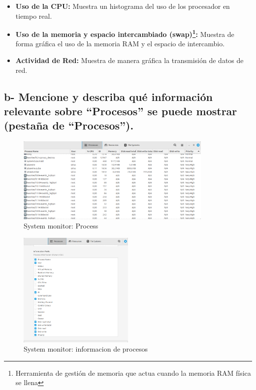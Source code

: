\documentclass{article}
\begin{document}
\begin{itemize}
    \item \textbf{Uso de la CPU:} Muestra un histograma del uso de los procesador en tiempo real.
    \item \textbf{Uso de la memoria y espacio intercambiado (swap)\footnote{Herramienta de gestión de memoria que actua cuando la memoria RAM física se llena}: }
    Muestra de forma gráfica el uso de la memoria RAM y el espacio de intercambio.
    \item \textbf{Actividad de Red: } Muestra de manera gráfica la transmisión de  datos de red.
\end{itemize}

\subsection*{b- Mencione y describa qué información relevante sobre “Procesos” se puede mostrar (pestaña de “Procesos”).}

\begin{figure}[h]
  \centering
  \includegraphics[width=0.85\textwidth]{resources/ej2b2.png}
  \caption{System monitor: Process}
\end{figure}

\begin{figure}[h]
  \centering
  \includegraphics[width=0.5\textwidth]{resources/ej2b.png}
  \caption{System monitor: informacion de procesos}
\end{figure}
\end{document}
